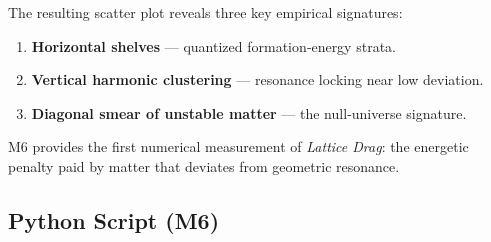 \documentclass[11pt, letterpaper, openany]{book}
\begin{document}
The resulting scatter plot reveals three key empirical signatures:

\begin{enumerate}
    \item \textbf{Horizontal shelves} — quantized formation‑energy strata.
    \item \textbf{Vertical harmonic clustering} — resonance locking near low deviation.
    \item \textbf{Diagonal smear of unstable matter} — the null‑universe signature.
\end{enumerate}

M6 provides the first numerical measurement of \emph{Lattice Drag}: the energetic
penalty paid by matter that deviates from geometric resonance.

\subsection*{Python Script (M6)}
\end{document}
